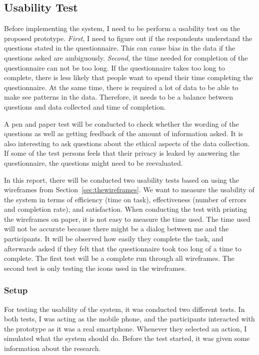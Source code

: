   \subsection{Usability Test}\label{sec:pretest}
  Before implementing the system, I need to be perform a usability test on the proposed prototype. {\it First}, I need to figure out if the respondents understand the questions stated in the questionnaire. This can cause bias in the data if the questions asked are ambiguously. {\it Second}, the time needed for completion of the questionnaire can not be too long. If the questionnaire takes too long to complete, there is less likely that people want to spend their time completing the questionnaire. At the same time, there is required a lot of data to be able to make see patterns in the data. Therefore, it needs to be a balance between questions and data collected and time of completion.

  A pen and paper test will be conducted to check whether the wording of the questions as well as getting feedback of the amount of information asked. It is also interesting to ask questions about the ethical aspects of the data collection. If some of the test persons feels that their privacy is leaked by answering the questionnaire, the questions might need to be reevaluated.

  In this report, there will be conducted two usability tests based on using the wireframes from Section~\ref{sec:thewireframes}. We want to measure the usability of the system in terms of efficiency (time on task), effectiveness (number of errors and completion rate), and satisfaction. When conducting the test with printing the wireframes on paper, it is not easy to measure the time used. The time used will not be accurate because there might be a dialog between me and the participants. It will be observed how easily they complete the task, and afterwards asked if they felt that the questionnaire took too long of a time to complete. The first test will be a complete run through all wireframes. The second test is only testing the icons used in the wireframes.

  \subsubsection*{Setup}

  For testing the usability of the system, it was conducted two different tests. In both tests, I was acting as the mobile phone, and the participants interacted with the prototype as it was a real smartphone. Whenever they selected an action, I simulated what the system should do.
  Before the test started, it was given some information about the research.  
  
